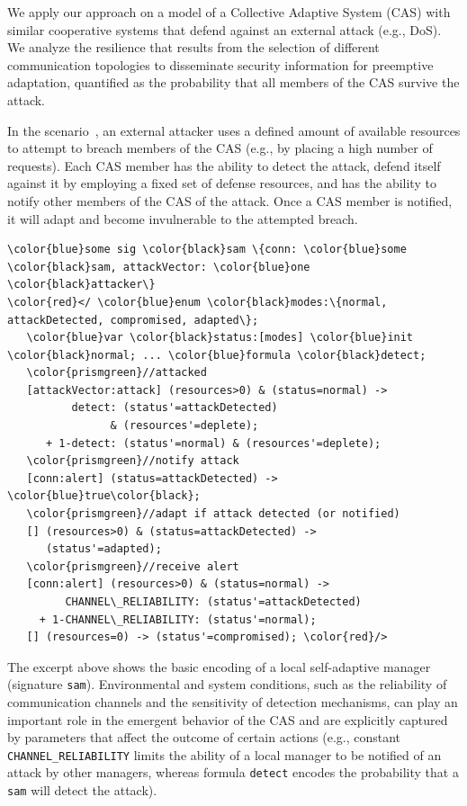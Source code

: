 \documentclass[10pt,journal,compsoc]{IEEEtran}
\begin{document}
We apply our approach on a model of a Collective Adaptive System (CAS) with similar cooperative systems that defend against an external attack (e.g., DoS). 
We analyze the resilience that results from the selection of different communication topologies to disseminate security information for preemptive adaptation, quantified as the probability that all members of the CAS survive the attack. 

In the scenario~\cite{caspubh}, an external attacker uses a defined amount of available resources to attempt to breach members of the CAS (e.g., by placing a high number of requests). 
Each CAS member has the ability to detect the attack, defend itself against it by employing a fixed set of defense resources, and has the ability to notify other members of the CAS of the attack. Once a CAS member is notified, it will adapt and become invulnerable to the attempted breach.  
 
 {\scriptsize
 \begin{Verbatim}[commandchars=\\\{\},codes={\catcode`$=3\catcode`^=7\catcode`_=8}]
 \color{blue}some sig \color{black}sam \{conn: \color{blue}some \color{black}sam, attackVector: \color{blue}one \color{black}attacker\}
\color{red}</ \color{blue}enum \color{black}modes:\{normal, attackDetected, compromised, adapted\};
   \color{blue}var \color{black}status:[modes] \color{blue}init \color{black}normal; ... \color{blue}formula \color{black}detect;
   \color{prismgreen}//attacked
   [attackVector:attack] (resources>0) & (status=normal) -> 
          detect: (status'=attackDetected) 
                & (resources'=deplete); 
      + 1-detect: (status'=normal) & (resources'=deplete);
   \color{prismgreen}//notify attack
   [conn:alert] (status=attackDetected) -> \color{blue}true\color{black}; 
   \color{prismgreen}//adapt if attack detected (or notified)
   [] (resources>0) & (status=attackDetected) -> 
      (status'=adapted);
   \color{prismgreen}//receive alert
   [conn:alert] (resources>0) & (status=normal) ->
         CHANNEL\_RELIABILITY: (status'=attackDetected)
     + 1-CHANNEL\_RELIABILITY: (status'=normal); 
   [] (resources=0) -> (status'=compromised); \color{red}/>
\end{Verbatim}
}

The excerpt above shows the basic encoding of a local self-adaptive manager (signature {\tt sam}). 
Environmental and system conditions, such as the reliability of communication channels and the sensitivity of detection mechanisms, can play an important role in the emergent behavior of the CAS and are explicitly captured by parameters that affect the outcome of certain actions (e.g., constant {\tt CHANNEL\_RELIABILITY} limits the ability of a local manager to be notified of an attack by other managers, whereas formula {\tt detect} encodes the probability that a {\tt sam} will detect the attack).
\end{document}
